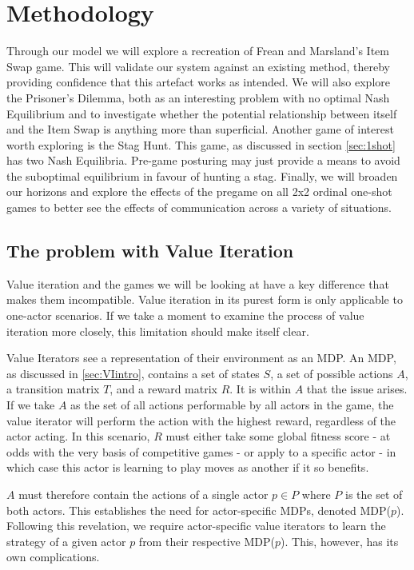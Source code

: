 \chapter{Methodology}\label{C:met}

Through our model we will explore a recreation of Frean and Marsland's \cite{frean2022holds} Item Swap game. This will validate our system against an existing method, thereby providing confidence that this artefact works as intended. We will also explore the Prisoner's Dilemma, both as an interesting problem with no optimal Nash Equilibrium and to investigate whether the potential relationship between itself and the Item Swap is anything more than superficial. Another game of interest worth exploring is the Stag Hunt. This game, as discussed in section \ref{sec:1shot} has two Nash Equilibria. Pre-game posturing may just provide a means to avoid the suboptimal equilibrium in favour of hunting a stag. Finally, we will broaden our horizons and explore the effects of the pregame on all 2x2 ordinal one-shot games to better see the effects of communication across a variety of situations.

\section{The problem with Value Iteration}

Value iteration and the games we will be looking at have a key difference that makes them incompatible. Value iteration in its purest form is only applicable to one-actor scenarios. If we take a moment to examine the process of value iteration more closely, this limitation should make itself clear.

Value Iterators see a representation of their environment as an MDP. An MDP, as discussed in \ref{sec:VIintro}, contains a set of states $S$, a set of possible actions $A$, a transition matrix $T$, and a reward matrix $R$. It is within $A$ that the issue arises. If we take $A$ as the set of all actions performable by all actors in the game, the value iterator will perform the action with the highest reward, regardless of the actor acting. In this scenario, $R$ must either take some global fitness score - at odds with the very basis of competitive games - or apply to a specific actor - in which case this actor is learning to play moves as another if it so benefits.

$A$ must therefore contain the actions of a single actor $p \in P$ where $P$ is the set of both actors. This establishes the need for actor-specific MDPs, denoted MDP($p$). Following this revelation, we require actor-specific value iterators to learn the strategy of a given actor $p$ from their respective MDP($p$). This, however, has its own complications. 

